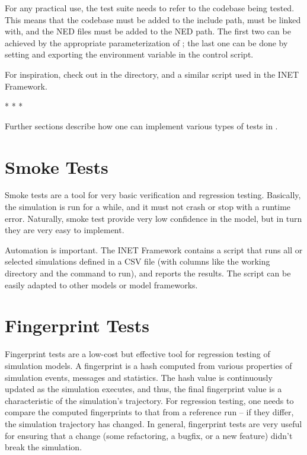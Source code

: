 For any practical use, the test suite needs to refer to the codebase being
tested. This means that the codebase must be added to the include path,
must be linked with, and the NED files must be added to the NED path. The
first two can be achieved by the appropriate parameterization of
; the last one can be done by setting and exporting
the  environment variable in the control script.

For inspiration, check out  in the 
directory, and a similar script used in the INET Framework.

\bigskip
\begin{center}
* * *
\end{center}
\bigskip

Further sections describe how one can implement various types of tests in
{\opp}.

\section{Smoke Tests}
\label{sec:testing:smoke-tests}

Smoke tests are a tool for very basic verification and regression testing.
Basically, the simulation is run for a while, and it must not crash or stop
with a runtime error. Naturally, smoke test provide very low confidence in
the model, but in turn they are very easy to implement.

Automation is important. The INET Framework contains a script that runs all
or selected simulations defined in a CSV file (with columns like the working
directory and the command to run), and reports the results. The script can
be easily adapted to other models or model frameworks.


\section{Fingerprint Tests}
\label{sec:testing:fingerprint-tests}

Fingerprint tests are a low-cost but effective tool for regression testing
of simulation models. A fingerprint is a hash computed from various properties
of simulation events, messages and statistics. The hash value is continuously
updated as the simulation executes, and thus, the final fingerprint value is
a characteristic of the simulation's trajectory. For regression testing, one
needs to compare the computed fingerprints to that from a reference run --
if they differ, the simulation trajectory has changed. In general, fingerprint
tests are very useful for ensuring that a change (some refactoring, a bugfix,
or a new feature) didn't break the simulation.

